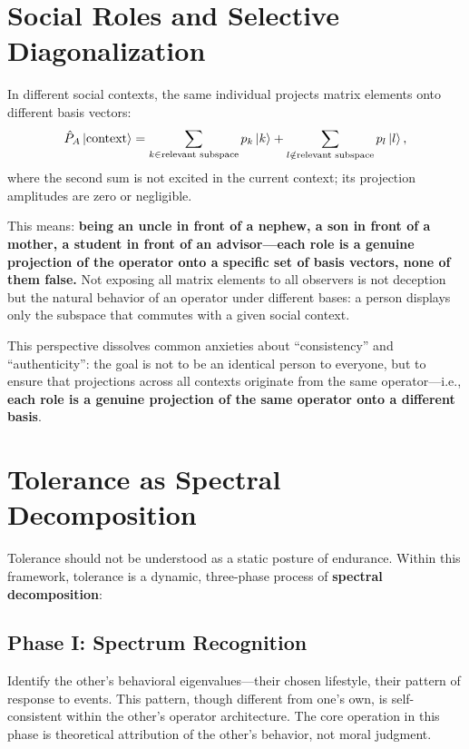 ﻿\documentclass[11pt,a4paper]{article}
\begin{document}
\section{Social Roles and Selective Diagonalization}

In different social contexts, the same individual projects matrix elements onto different basis vectors:
\begin{equation}
\hat{P}_A \ket{\text{context}} = \sum_{k\in\text{relevant subspace}} p_{k} \ket{k} + \sum_{l\notin\text{relevant subspace}} p_{l} \ket{l},
\end{equation}
where the second sum is not excited in the current context; its projection amplitudes are zero or negligible.

This means: \textbf{being an uncle in front of a nephew, a son in front of a mother, a student in front of an advisor---each role is a genuine projection of the operator onto a specific set of basis vectors, none of them false.} Not exposing all matrix elements to all observers is not deception but the natural behavior of an operator under different bases: a person displays only the subspace that commutes with a given social context.

This perspective dissolves common anxieties about ``consistency'' and ``authenticity'': the goal is not to be an identical person to everyone, but to ensure that projections across all contexts originate from the same operator---i.e., \textbf{each role is a genuine projection of the same operator onto a different basis}.
\section{Tolerance as Spectral Decomposition}

Tolerance should not be understood as a static posture of endurance. Within this framework, tolerance is a dynamic, three-phase process of \textbf{spectral decomposition}:

\subsection*{Phase I: Spectrum Recognition}

Identify the other's behavioral eigenvalues---their chosen lifestyle, their pattern of response to events. This pattern, though different from one's own, is self-consistent within the other's operator architecture. The core operation in this phase is theoretical attribution of the other's behavior, not moral judgment.
\end{document}
